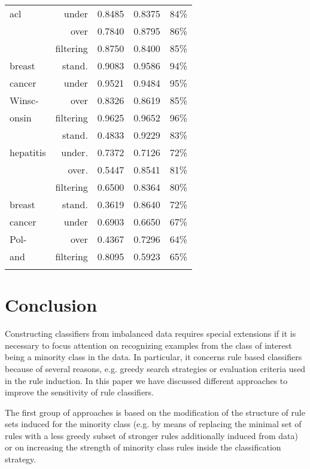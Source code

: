 \documentclass{AIMeth05}
\begin{document}
\begin{table}
\begin{tabular}{lrccc}
 acl & under & 0.8485 & 0.8375 & 84\% \\
     & over & 0.7840 & 0.8795 & 86\% \\
    & filtering & 0.8750 & 0.8400 & 85\% \\ \hline
 breast    & stand. & 0.9083 & 0.9586 & 94\% \\
 cancer & under & 0.9521 & 0.9484 & 95\% \\
 Winsc- & over & 0.8326 & 0.8619 & 85\% \\
 onsin & filtering & 0.9625 & 0.9652 & 96\%\\ \hline
  & stand. & 0.4833 & 0.9229 & 83\% \\
hepatitis & under. & 0.7372 & 0.7126 & 72\% \\
 & over. & 0.5447 & 0.8541 & 81\% \\
 & filtering & 0.6500 & 0.8364 & 80\%\\ \hline
  breast    & stand. & 0.3619 & 0.8640 & 72\% \\
 cancer & under & 0.6903 & 0.6650 & 67\% \\
 Pol- & over & 0.4367 & 0.7296 & 64\% \\
 and & filtering & 0.8095 & 0.5923 & 65\%\\
 \noalign{\smallskip}
 \hline
\end{tabular}
\label{tab:sensitivity}
\end{table}



\section{Conclusion}

Constructing classifiers from imbalanced data requires special extensions if
it is necessary to focus attention on recognizing examples from the class of
interest being a minority class in the data. In particular, it concerns rule
based classifiers because of several reasons, e.g. greedy search strategies
or evaluation criteria used in the rule induction. In this paper we have
discussed different approaches to improve the sensitivity of rule
classifiers.

The first group of approaches is based on the modification of the structure
of rule sets induced for the minority class (e.g. by means of replacing the
minimal set of rules with a less greedy subset of stronger rules
additionally induced from data) or on increasing the strength of minority
class rules inside the classification strategy.
\end{document}
